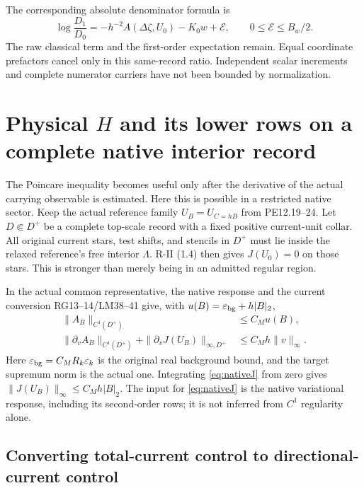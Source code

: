 \documentclass[11pt,letterpaper]{article}
\numberwithin{equation}{section}
\theoremstyle{plain}
\theoremstyle{remark}
\begin{document}
The corresponding absolute denominator formula is
\begin{equation}
 \log\frac{D_1}{D_0}
 =-h^{-2}A(\Delta\zeta,U_0)-K_0w+\mathcal E,
 \qquad 0\le\mathcal E\le B_w/2.
 \label{eq:rawratio}
\end{equation}
The raw classical term and the first-order expectation remain. Equal coordinate
prefactors cancel only in this same-record ratio. Independent scalar increments
and complete numerator carriers have not been bounded by normalization.

\section{Physical \texorpdfstring{$H$}{H} and its lower rows on a complete native interior record}
\label{sec:physicalnative}

The Poincare inequality becomes useful only after the derivative of the actual
carrying observable is estimated. Here this is possible in a restricted native
sector. Keep the actual reference family $U_B=U_{C=hB}$ from PE12.19--24.
Let $D\Subset D^+$ be a complete top-scale record with a fixed positive current-unit
collar. All original current stars, test shifts, and stencils in $D^+$ must lie
inside the relaxed reference's free interior $\Lambda$. R-II (1.4) then gives
$J(U_0)=0$ on those stars. This is stronger than merely being in an admitted
regular region.

In the actual common representative, the native response and the current
conversion RG13--14/LM38--41 give, with
$u(B)=\varepsilon_{\rm bg}+h|B|_2$,
\begin{align}
 \|A_B\|_{C^1(D^+)}&\le C_Mu(B),\label{eq:nativeA}\\
 \|\partial_vA_B\|_{C^1(D^+)}
   +\|\partial_vJ(U_B)\|_{\infty,D^+}
 &\le C_Mh\|v\|_\infty.\label{eq:nativeJ}
\end{align}
Here $\varepsilon_{\rm bg}=C_MR_k\varepsilon_k$ is the original real background
bound, and the target supremum norm is the actual one. Integrating
\eqref{eq:nativeJ} from zero gives $\|J(U_B)\|_\infty\le C_Mh|B|_2$.
The input for \eqref{eq:nativeJ} is the native variational response, including
its second-order rows; it is not inferred from $C^1$ regularity alone.

\subsection{Converting total-current control to directional-current control}
\end{document}
